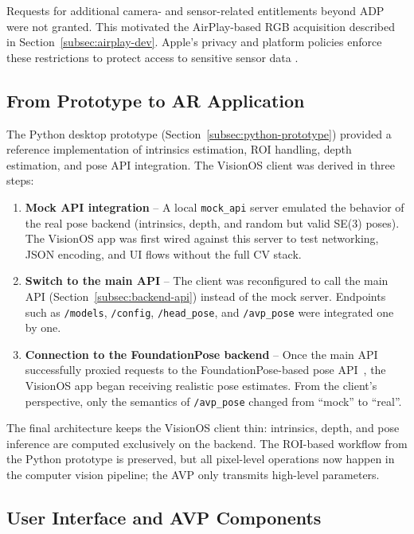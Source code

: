 Requests for additional camera- and sensor-related entitlements beyond ADP were not granted. This motivated the AirPlay-based RGB acquisition described in Section~\ref{subsec:airplay-dev}. Apple’s privacy and platform policies enforce these restrictions to protect access to sensitive sensor data \cite{apple_entitlements}.

\subsection{From Prototype to AR Application}

The Python desktop prototype (Section~\ref{subsec:python-prototype}) provided a reference implementation of intrinsics estimation, ROI handling, depth estimation, and pose API integration. The VisionOS client was derived in three steps:

\begin{enumerate}
    \item \textbf{Mock API integration} – A local \texttt{mock\_api} server emulated the behavior of the real pose backend (intrinsics, depth, and random but valid SE(3) poses). The VisionOS app was first wired against this server to test networking, JSON encoding, and UI flows without the full CV stack.
    \item \textbf{Switch to the main API} – The client was reconfigured to call the main API (Section~\ref{subsec:backend-api}) instead of the mock server. Endpoints such as \texttt{/models}, \texttt{/config}, \texttt{/head\_pose}, and \texttt{/avp\_pose} were integrated one by one.
    \item \textbf{Connection to the FoundationPose backend} – Once the main API successfully proxied requests to the FoundationPose-based pose API~\cite{matchcow_pose_api}, the VisionOS app began receiving realistic pose estimates. From the client’s perspective, only the semantics of \texttt{/avp\_pose} changed from “mock” to “real”.
\end{enumerate}

The final architecture keeps the VisionOS client thin: intrinsics, depth, and pose inference are computed exclusively on the backend. The ROI-based workflow from the Python prototype is preserved, but all pixel-level operations now happen in the computer vision pipeline; the AVP only transmits high-level parameters.

\subsection{User Interface and AVP Components}


